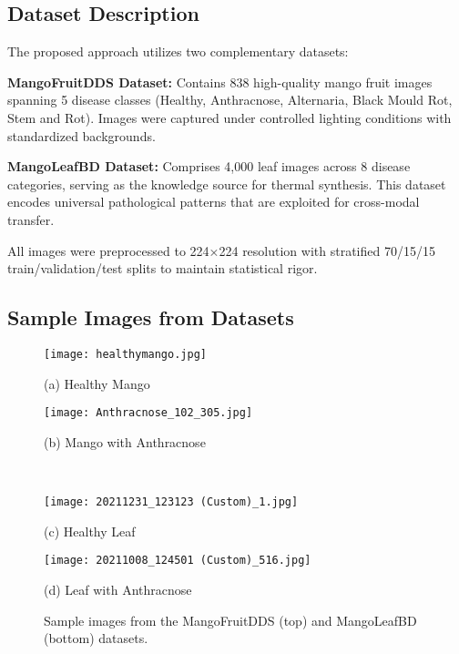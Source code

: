 \documentclass[conference]{IEEEtran}
\begin{document}
\subsection{Dataset Description}

The proposed approach utilizes two complementary datasets:

\textbf{MangoFruitDDS Dataset:} Contains 838 high-quality mango fruit images spanning 5 disease classes (Healthy, Anthracnose, Alternaria, Black Mould Rot, Stem and Rot). Images were captured under controlled lighting conditions with standardized backgrounds.

\textbf{MangoLeafBD Dataset:} Comprises 4,000 leaf images across 8 disease categories, serving as the knowledge source for thermal synthesis. This dataset encodes universal pathological patterns that are exploited for cross-modal transfer.

All images were preprocessed to 224×224 resolution with stratified 70/15/15 train/validation/test splits to maintain statistical rigor.

\subsection{Sample Images from Datasets}

\begin{figure}[!t]
    \raggedright
    \begin{minipage}{0.22\textwidth}
        \centering
        \texttt{[image: healthymango.jpg]}
        \caption*{(a) Healthy Mango}
    \end{minipage}
    \hfill
    \begin{minipage}{0.22\textwidth}
        \centering
        \texttt{[image: Anthracnose\_102\_305.jpg]}
        \caption*{(b) Mango with Anthracnose}
    \end{minipage}
    \\
    \vspace{0.5em}
    \begin{minipage}{0.22\textwidth}
        \centering
        \texttt{[image: 20211231\_123123 (Custom)\_1.jpg]}
        \caption*{(c) Healthy Leaf}
    \end{minipage}
    \hfill
    \begin{minipage}{0.22\textwidth}
        \centering
        \texttt{[image: 20211008\_124501 (Custom)\_516.jpg]}
        \caption*{(d) Leaf with Anthracnose}
    \end{minipage}
    \caption{Sample images from the MangoFruitDDS (top) and MangoLeafBD (bottom) datasets.}
    \label{fig:sample_images}
\end{figure}
\end{document}
